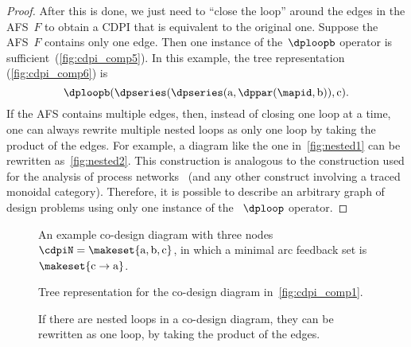 \begin{proof}
    After this is done, we just need to ``close the loop'' around the edges in the AFS~$F$ to obtain a CDPI that is equivalent to the original one.
    Suppose the AFS~$F$ contains only one edge.
    Then one instance of the~$\dploopb$ operator is sufficient~(\cref{fig:cdpi_comp5}).
    In this example, the tree representation (\cref{fig:cdpi_comp6}) is
    \begin{equation}
        \dploopb(\dpseries(\dpseries(\text{a},\dppar(\mapid,\text{b})),\text{c}).
    \end{equation}
    If the AFS contains multiple edges, then, instead of closing one loop at a time, one can always rewrite multiple nested loops as only one loop by taking the product of the edges.
    For example, a diagram like the one in~\cref{fig:nested1} can be rewritten as~\cref{fig:nested2}.
    This construction is analogous to the construction used for the analysis of process networks~\cite{lee10} (and any other construct involving a traced monoidal category).
    Therefore, it is possible to describe an arbitrary graph of design problems using only one instance of the ~$\dploop$ operator.
\end{proof}

\begin{figure}[tbh]
    \hfill{}
    \hfill{}

    \caption{An example co-design diagram with three nodes~$\cdpiN=\makeset{\text{a},\text{b},\text{c}}$,
        in which a minimal arc feedback set is $\makeset{\text{c}\rightarrow\text{a}}$.
    }
\end{figure}

\begin{figure}
    \hfill{}
    \hfill{}
    \hfill{}

    \caption{Tree representation for the co-design diagram in~\cref{fig:cdpi_comp1}.}
\end{figure}

\begin{figure}[h]

    \caption{If there are nested loops in a co-design diagram, they can be rewritten as one loop, by taking the product of the edges.}
    \label{fig:If-there-are}
\end{figure}

